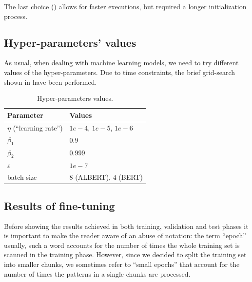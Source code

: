 \documentclass[10pt,hidelinks]{article}
\def\colOne{white}
\def\colTwo{pblue!10}
\def\colHea{pblue!35}
\begin{document}
The last choice () allows for faster executions, but required a longer initialization process.

\subsection{Hyper-parameters' values}
As usual, when dealing with machine learning models, we need to try different values of the hyper-parameters. Due to time constraints, the brief grid-search shown in  have been performed.

\begin{table}[ht!]
	\footnotesize\centering
	\rowcolors{2}{\colOne}{\colTwo}
	\begin{tabular}{|l|p{60mm}|}
		\hline\rowcolor{\colHea} Parameter & Values\\\hline\hline
		$ \eta $ (``learning rate'') & $ 1e-4$, $1e-5$, $1e-6$ \\
		$\beta_1$ & $0.9$\\
		$\beta_2$ & $0.999$\\
		$\varepsilon$ & $1e-7$\\
		batch size & $8$ (ALBERT), $4$ (BERT)\\
		\end{tabular}
	\caption{Hyper-parameters values.}\label{tab:grid_search}
\end{table}

\subsection{Results of fine-tuning}
Before showing the results achieved in both training, validation and test phases it is important to make the reader aware of an abuse of notation: the term ``epoch'' usually, such a word accounts for the number of times the whole training set is scanned in the training phase.
However, since we decided to split the training set into smaller chunks, we sometimes refer to ``small epochs'' that account for the number of times the patterns in a single chunks are processed.

\end{document}

